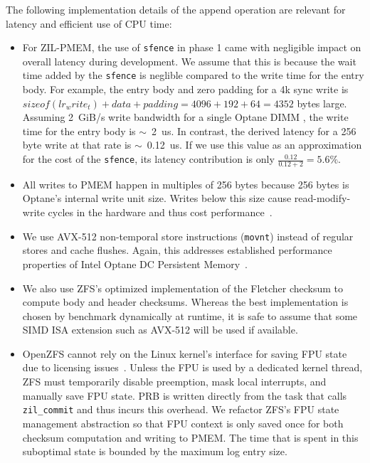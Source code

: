 \documentclass[12pt,a4paper,twoside]{book}
\begin{document}
The following implementation details of the append operation are relevant for latency and efficient use of CPU time:
\begin{itemize}[noitemsep]
    \item For ZIL-PMEM, the use of \lstinline{sfence} in phase 1 came with negligible impact on overall latency during development.
        We assume that this is because the wait time added by the \lstinline{sfence} is neglible compared to the write time for the entry body.
        For example, the entry body and zero padding for a 4k sync write is $sizeof(lr_write_t) + data + padding = 4096 + 192 + 64 = 4352$ bytes large.
        Assuming \SI{2}{GiB/s} write bandwidth for a single Optane DIMM \cite{yangEmpiricalGuideBehavior2020}, the write time for the entry body is $\sim$~\SI{2}{us}.
        In contrast, the derived latency for a 256 byte write at that rate is $\sim$~\SI{0.12}{us}.
        If we use this value as an approximation for the cost of the \lstinline{sfence}, its latency contribution is only $\frac{0.12}{0.12 + 2} = 5.6\%$.
    \item All writes to PMEM happen in multiples of 256 bytes because 256 bytes is Optane's internal write unit size.
        Writes below this size cause read-modify-write cycles in the hardware and thus cost performance~\cite{yangEmpiricalGuideBehavior2020,zhangChameleonDBKeyvalueStore2021}.
    \item We use AVX-512 non-temporal store instructions (\lstinline{movnt}) instead of regular stores and cache flushes.
        Again, this addresses established performance properties of Intel Optane DC Persistent Memory~\cite{yangEmpiricalGuideBehavior2020}.
    \item We also use ZFS's optimized implementation of the Fletcher checksum to compute body and header checksums.
        Whereas the best implementation is chosen by benchmark dynamically at runtime, it is safe to assume that some SIMD ISA extension such as AVX-512 will be used if available.
    \item OpenZFS cannot rely on the Linux kernel's interface for saving FPU state due to licensing issues~\cite{LinuxCompatSIMD}.
        Unless the FPU is used by a dedicated kernel thread, ZFS must temporarily disable preemption, mask local interrupts, and manually save FPU state.
        PRB is written directly from the task that calls \lstinline{zil_commit} and thus incurs this overhead.
        We refactor ZFS's FPU state management abstraction so that FPU context is only saved once for both checksum computation and writing to PMEM.
        The time that is spent in this suboptimal state is bounded by the maximum log entry size.
\end{itemize}
\end{document}

